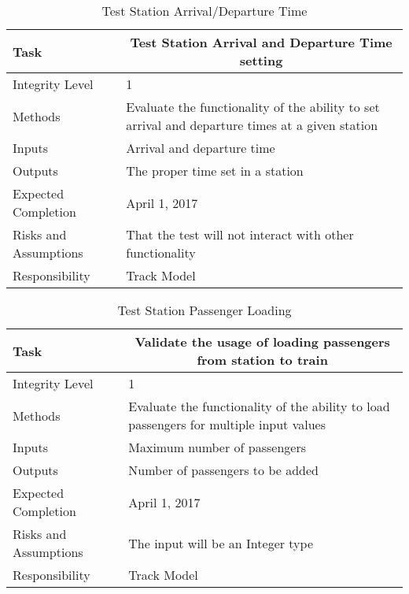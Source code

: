\documentclass[]{article}
\begin{document}
\begin{table}[H]
	\centering
	\caption{Test Station Arrival/Departure Time}
	\begin{tabular}{|l|l|}
		\hline
		Task & \multicolumn{1}{c|}{Test Station Arrival and Departure Time setting} \\ \hline
		Integrity Level & 1 \\ \hline
		Methods & Evaluate the functionality of the ability to set arrival and departure times at a given station \\ \hline
		Inputs &  Arrival and departure time \\ \hline
		Outputs &  \parbox[t]{10cm}{The proper time set in a station}\\ \hline
		Expected Completion & April 1, 2017\\ \hline
		Risks and Assumptions & That the test will not interact with other functionality \\ \hline
		Responsibility & Track Model\\ \hline
	\end{tabular}
\end{table}

\begin{table}[H]
	\centering
	\caption{Test Station Passenger Loading}
	\begin{tabular}{|l|l|}
		\hline
		Task & \multicolumn{1}{c|}{Validate the usage of loading passengers from station to train} \\ \hline
		Integrity Level & 1 \\ \hline
		Methods & Evaluate the functionality of the ability to load passengers for multiple input values \\ \hline
		Inputs &  Maximum number of passengers\\ \hline
		Outputs &  \parbox[t]{10cm}{Number of passengers to be added}\\ \hline
		Expected Completion & April 1, 2017\\ \hline
		Risks and Assumptions & The input will be an Integer type \\ \hline
		Responsibility & Track Model\\ \hline
	\end{tabular}
\end{table}
\end{document}
